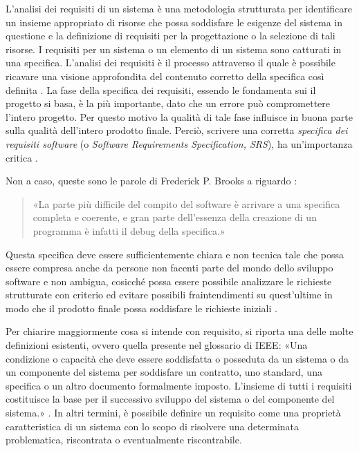 L'analisi dei requisiti di un sistema è una metodologia strutturata per identificare un insieme appropriato di risorse che possa soddisfare le esigenze del sistema in questione e la definizione di requisiti per la progettazione o la selezione di tali risorse. I requisiti per un sistema o un elemento di un sistema sono catturati in una specifica. L’analisi dei requisiti è il processo attraverso il quale è possibile ricavare una visione approfondita del contenuto corretto della specifica così definita \cite{system_requirements_analysis}.
La fase della specifica dei requisiti, essendo le fondamenta sui il progetto si basa, è la più importante, dato che un errore può compromettere l'intero progetto. Per questo motivo la qualità di tale fase influisce in buona parte sulla qualità dell'intero prodotto finale. Perciò, scrivere una corretta \textit{specifica dei requisiti software} (o \textit{Software Requirements Specification, SRS}), ha un'importanza critica \cite{researchgate_srs_introduction}.

Non a caso, queste sono le parole di Frederick P. Brooks a riguardo \cite{brooks_srs}:

\begin{quote}
    «La parte più difficile del compito del software è arrivare a una specifica completa e coerente, e gran parte dell'essenza della creazione di un programma è infatti il debug della specifica.»
\end{quote}

Questa specifica deve essere sufficientemente chiara e non tecnica tale che possa essere compresa anche da persone non facenti parte del mondo dello sviluppo software e non ambigua, cosicché possa essere possibile analizzare le richieste strutturate con criterio ed evitare possibili fraintendimenti su quest'ultime in modo che il prodotto finale possa soddisfare le richieste iniziali \cite{researchgate_srs_structure}.

Per chiarire maggiormente cosa si intende con requisito, si riporta una delle molte definizioni esistenti, ovvero quella presente nel glossario di IEEE: «Una condizione o capacità che deve essere soddisfatta o posseduta da un sistema o da un componente del sistema per soddisfare un contratto, uno standard, una specifica o un altro documento formalmente imposto. L'insieme di tutti i requisiti costituisce la base per il successivo sviluppo del sistema o del componente del sistema.» \cite{software_requirements}. In altri termini, è possibile definire un requisito come una proprietà caratteristica di un sistema con lo scopo di risolvere una determinata problematica, riscontrata o eventualmente riscontrabile.

